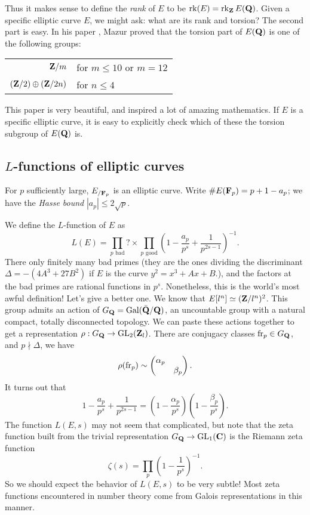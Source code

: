 Thus it makes sense to define the \emph{rank} of $E$ to be 
$\operatorname{rk}(E)=\operatorname{rk}_{\mathbf{Z}} E(\mathbf{Q})$. Given a specific elliptic curve $E$, we might ask: 
what are its rank and torsion? The second part is easy. In his paper 
\cite{mazur-1977}, Mazur proved that the torsion part of $E(\mathbf{Q})$ is one of the 
following groups:
\begin{center}
\begin{tabular}{rl}
$\mathbf{Z}/m$ & for $m\leqslant 10$ or $m=12$ \\
$(\mathbf{Z}/2)\oplus (\mathbf{Z}/2 n)$ & for $n\leqslant 4$ 
\end{tabular}
\end{center}
This paper is very beautiful, and inspired a lot of amazing mathematics. If $E$ 
is a specific elliptic curve, it is easy to explicitly check which of these the 
torsion subgroup of $E(\mathbf{Q})$ is. 





\subsection{\texorpdfstring{$L$}{L}-functions of elliptic curves}

For $p$ sufficiently large, $E_{/\mathbf{F}_p}$ is an elliptic curve. Write 
$\# E(\mathbf{F}_p)=p+1-a_p$; we have the \emph{Hasse bound} $|a_p|\leqslant 2\sqrt p$. 

We define the $L$-function of $E$ as 
\[
  L(E) = \prod_{p \text{ bad}} ? \times \prod_{p\text{ good}} \left(1-\frac{a_p}{p^s} + \frac{1}{p^{2s-1}}\right)^{-1} .
\]
There only finitely many bad primes (they are the ones dividing 
the discriminant $\Delta=-(4 A^3+27 B^2)$ if $E$ is the curve 
$y^2=x^3+A x+B$.), and the factors at the bad primes are rational functions in 
$p^s$. Nonetheless, this is the world's most awful definition! Let's give a 
better one. We know that 
$E[l^n]\simeq (\mathbf{Z}/l^n)^2$. This group admits an action of 
$G_{\mathbf{Q}}=\operatorname{Gal}(\bar{\mathbf{Q}}/\mathbf{Q})$, an uncountable group with a natural 
compact, totally disconnected topology. We can paste these actions together 
to get a representation $\rho:G_{\mathbf{Q}}\to \operatorname{GL}_2(\mathbf{Z}_l)$. There are conjugacy 
classes $\mathrm{fr}_p\in G_{\mathbf{Q}}$, and $p\nmid \Delta$, we have 
\[
  \rho(\mathrm{fr}_p) \sim \begin{pmatrix} \alpha_p \\ & \beta_p \end{pmatrix} .
\]
It turns out that 
\[
  1-\frac{a_p}{p^s} + \frac{1}{p^{2s-1}} = \left(1-\frac{\alpha_p}{p^s}\right)\left(1 - \frac{\beta_p}{p^s}\right) .
\]
The function $L(E,s)$ may not seem that complicated, but note that the zeta 
function built from the trivial representation $G_{\mathbf{Q}}\to \operatorname{GL}_1(\mathbf{C})$ is the 
Riemann zeta function 
\[
  \zeta(s)=\prod_p \left(1-\frac{1}{p^s}\right)^{-1} .
\]
So we should expect the behavior of $L(E,s)$ to be very subtle! Most zeta 
functions encountered in number theory come from Galois representations in this 
manner. 


